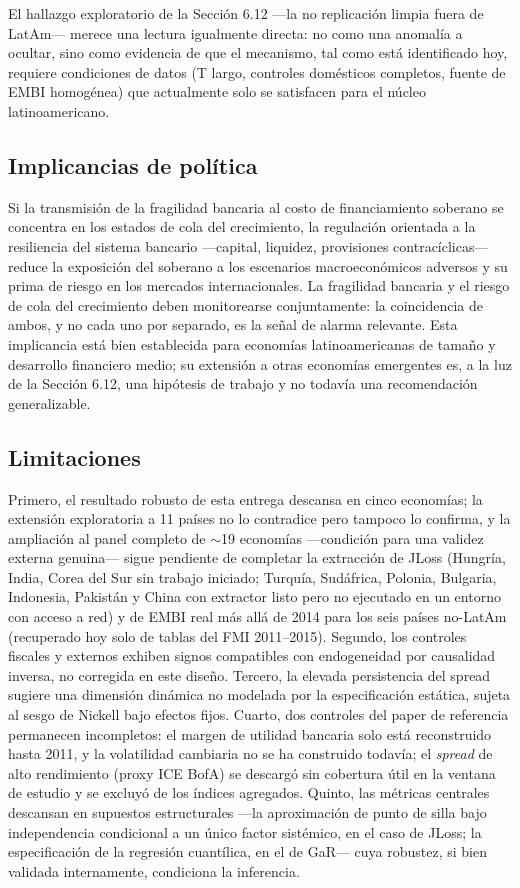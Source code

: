 \documentclass[5p,times,twocolumn,authoryear]{elsarticle}
\begin{document}
El hallazgo exploratorio de la Sección 6.12 —la no replicación limpia fuera de LatAm— merece una lectura igualmente directa: no como una anomalía a ocultar, sino como evidencia de que el mecanismo, tal como está identificado hoy, requiere condiciones de datos (T largo, controles domésticos completos, fuente de EMBI homogénea) que actualmente solo se satisfacen para el núcleo latinoamericano.

\subsection{Implicancias de política}

Si la transmisión de la fragilidad bancaria al costo de financiamiento soberano se concentra en los estados de cola del crecimiento, la regulación orientada a la resiliencia del sistema bancario —capital, liquidez, provisiones contracíclicas— reduce la exposición del soberano a los escenarios macroeconómicos adversos y su prima de riesgo en los mercados internacionales. La fragilidad bancaria y el riesgo de cola del crecimiento deben monitorearse conjuntamente: la coincidencia de ambos, y no cada uno por separado, es la señal de alarma relevante. Esta implicancia está bien establecida para economías latinoamericanas de tamaño y desarrollo financiero medio; su extensión a otras economías emergentes es, a la luz de la Sección 6.12, una hipótesis de trabajo y no todavía una recomendación generalizable.

\subsection{Limitaciones}

Primero, el resultado robusto de esta entrega descansa en cinco economías; la extensión exploratoria a 11 países no lo contradice pero tampoco lo confirma, y la ampliación al panel completo de $\sim$19 economías —condición para una validez externa genuina— sigue pendiente de completar la extracción de JLoss (Hungría, India, Corea del Sur sin trabajo iniciado; Turquía, Sudáfrica, Polonia, Bulgaria, Indonesia, Pakistán y China con extractor listo pero no ejecutado en un entorno con acceso a red) y de EMBI real más allá de 2014 para los seis países no-LatAm (recuperado hoy solo de tablas del FMI 2011–2015). Segundo, los controles fiscales y externos exhiben signos compatibles con endogeneidad por causalidad inversa, no corregida en este diseño. Tercero, la elevada persistencia del spread sugiere una dimensión dinámica no modelada por la especificación estática, sujeta al sesgo de Nickell bajo efectos fijos. Cuarto, dos controles del paper de referencia permanecen incompletos: el margen de utilidad bancaria solo está reconstruido hasta 2011, y la volatilidad cambiaria no se ha construido todavía; el \textit{spread} de alto rendimiento (proxy ICE BofA) se descargó sin cobertura útil en la ventana de estudio y se excluyó de los índices agregados. Quinto, las métricas centrales descansan en supuestos estructurales —la aproximación de punto de silla bajo independencia condicional a un único factor sistémico, en el caso de JLoss; la especificación de la regresión cuantílica, en el de GaR— cuya robustez, si bien validada internamente, condiciona la inferencia.
\end{document}
